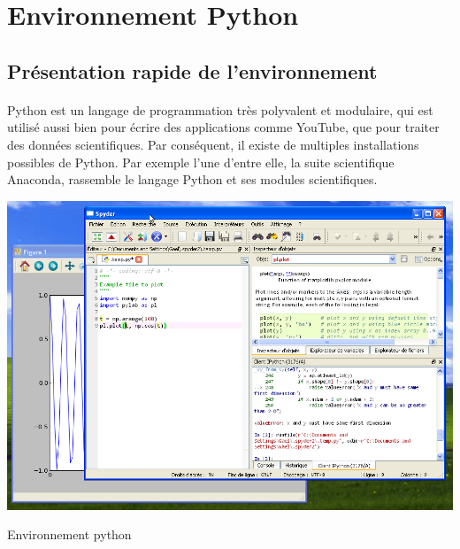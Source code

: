 \documentclass[a4paper,12pt]{article}
\begin{document}
\clearpage
\section{Environnement Python}
\subsection{Présentation rapide de l'environnement}
\paragraph{}
Python est un langage de programmation très polyvalent et modulaire, qui est utilisé aussi bien pour écrire des applications comme YouTube, que pour traiter des données scientifiques. Par conséquent, il existe de multiples installations possibles de Python. Par exemple l'une d'entre elle, la suite scientifique Anaconda, rassemble le langage Python et ses modules scientifiques.

\begin{center}
\includegraphics[width=1\textwidth]{EnvPython.png}
 \end{center}
 \begin{center}
 Environnement python
\end{center}
\end{document}
